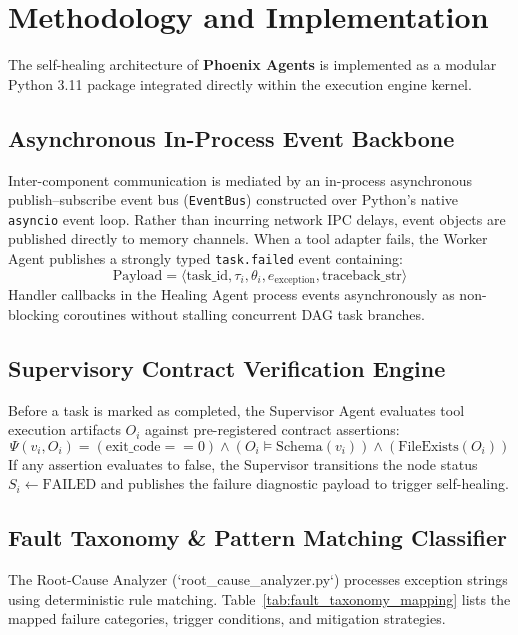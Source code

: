 \documentclass[conference]{IEEEtran}
\begin{document}
\section{Methodology and Implementation}
\label{sec:methodology}

The self-healing architecture of \textbf{Phoenix Agents} is implemented as a modular Python 3.11 package integrated directly within the execution engine kernel.

\subsection{Asynchronous In-Process Event Backbone}
Inter-component communication is mediated by an in-process asynchronous publish--subscribe event bus (\texttt{EventBus}) constructed over Python's native \texttt{asyncio} event loop. Rather than incurring network IPC delays, event objects are published directly to memory channels. When a tool adapter fails, the Worker Agent publishes a strongly typed \texttt{task.failed} event containing:
\begin{equation}
\text{Payload} = \langle \text{task\_id}, \tau_i, \theta_i, e_{\text{exception}}, \text{traceback\_str} \rangle
\end{equation}
Handler callbacks in the Healing Agent process events asynchronously as non-blocking coroutines without stalling concurrent DAG task branches.

\subsection{Supervisory Contract Verification Engine}
Before a task is marked as completed, the Supervisor Agent evaluates tool execution artifacts $O_i$ against pre-registered contract assertions:
\begin{equation}
\Psi(v_i, O_i) = (\text{exit\_code} == 0) \land (O_i \models \text{Schema}(v_i)) \land (\text{FileExists}(O_i))
\end{equation}
If any assertion evaluates to false, the Supervisor transitions the node status $S_i \leftarrow \text{FAILED}$ and publishes the failure diagnostic payload to trigger self-healing.

\subsection{Fault Taxonomy & Pattern Matching Classifier}
The Root-Cause Analyzer (`root\_cause\_analyzer.py`) processes exception strings using deterministic rule matching. Table~\ref{tab:fault_taxonomy_mapping} lists the mapped failure categories, trigger conditions, and mitigation strategies.
\end{document}
